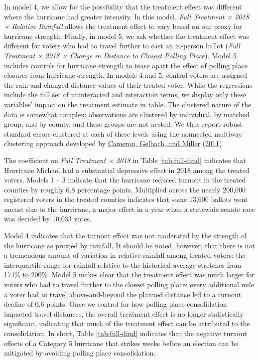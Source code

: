 \documentclass[
  12pt,
]{article}
\begin{document}
In model 4, we allow for the possibility that the treatment effect was different where the hurricane had greater intensity. In this model, \emph{Full Treatment × 2018 × Relative Rainfall} allows the treatment effect to vary based on our proxy for hurricane strength. Finally, in model 5, we ask whether the treatment effect was different for voters who had to travel further to cast an in-person ballot (\emph{Full Treatment × 2018 × Change in Distance to Closest Polling Place}). Model 5 includes controls for hurricane strength to tease apart the effect of polling place closures from hurricane strength. In models 4 and 5, control voters are assigned the rain and changed distance values of their treated voter. While the regressions include the full set of uninteracted and interaction terms, we display only these variables' impact on the treatment estimate in table. The clustered nature of the data is somewhat complex: observations are clustered by individual, by matched group, and by county, and these groups are not nested. We thus report robust standard errors clustered at each of these levels using the nonnested multiway clustering approach developed by \protect\hyperlink{ref-Cameron2011}{Cameron, Gelbach, and Miller} (\protect\hyperlink{ref-Cameron2011}{2011}).

\newpage
\begin{landscape}
\begin{singlespace}

\end{singlespace}
\end{landscape}

The coefficient on \emph{Full Treatment × 2018} in Table \ref{tab:full-dind} indicates that Hurricane Michael had a substantial depressive effect in 2018 among the treated voters. Models 1 -- 3 indicate that the hurricane reduced turnout in the treated counties by roughly 6.8 percentage points. Multiplied across the nearly 200,000 registered voters in the treated counties indicates that some 13,600 ballots went uncast due to the hurricane, a major effect in a year when a statewide senate race was decided by 10,033 votes.

Model 4 indicates that the turnout effect was not moderated by the strength of the hurricane as proxied by rainfall. It should be noted, however, that there is not a tremendous amount of variation in relative rainfall among treated voters: the interquartile range for rainfall relative to the historical average stretches from 174\% to 200\%. Model 5 makes clear that the treatment effect was much larger for voters who had to travel further to the closest polling place: every additional mile a voter had to travel above-and-beyond the planned distance led to a turnout decline of 0.6 points. Once we control for how polling place consolidation impacted travel distances, the overall treatment effect is no longer statistically significant, indicating that much of the treatment effect can be attributed to the consolidation. In short, Table \ref{tab:full-dind} indicates that the negative turnout effects of a Category 5 hurricane that strikes weeks before an election can be mitigated by avoiding polling place consolidation.
\end{document}
